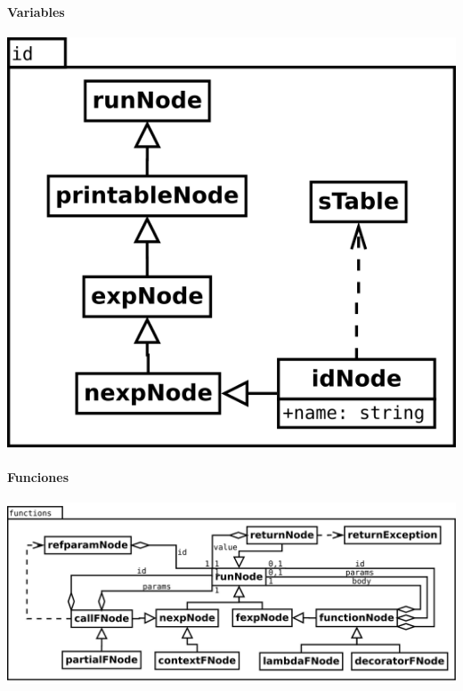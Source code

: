 \paragraph {Variables}
\begin{center}
\includegraphics[scale=0.4]{id.png} \\
\end{center}

\paragraph {Funciones}
\begin{center}
\includegraphics[scale=0.4]{functions.png} \\
\end{center}

